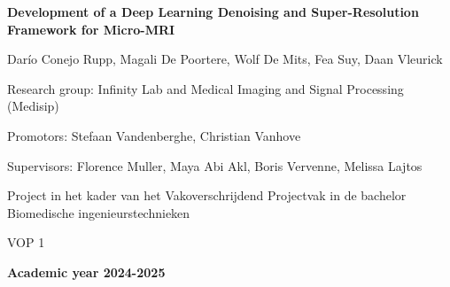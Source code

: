 \documentclass[twocolumn]{article}
\begin{document}
\begin{titlepage}
    \centering
    \vspace*{\fill}
    
    {\LARGE \textbf{Development of a Deep Learning Denoising and Super-Resolution Framework for Micro-MRI} \par}
    \vspace{0.5cm}

    {\Large Darío Conejo Rupp, Magali De Poortere, Wolf De Mits, Fea Suy, Daan Vleurick \par}
    \vspace{2cm}

    {\large Research group: Infinity Lab and Medical Imaging and Signal Processing (Medisip) \par}
    \vspace{0.2cm}

    {\large Promotors: Stefaan Vandenberghe, Christian Vanhove \par}
    \vspace{0.2cm}

    {\large Supervisors: Florence Muller, Maya Abi Akl, Boris Vervenne, Melissa Lajtos \par}

    \vspace{2cm}

    {\large {Project in het kader van het Vakoverschrijdend Projectvak in de bachelor Biomedische ingenieurstechnieken} \par}
    {\large {VOP 1} \par}
    {\large \textbf{Academic year 2024-2025} \par}

    \vspace*{\fill}
\end{titlepage}

\newpage
\onecolumn
\begin{abstract}
Magnetic resonance imaging (MRI) is a non‐invasive imaging technique that uses magnetic fields and radiofrequency pulses to generate detailed anatomical images. Micro-MRI, a preclinical imaging modality, offers excellent soft tissue contrast for anatomical visualization in rodent models. However, achieving an optimal balance between spatial resolution, acquisition time, and signal to noise ratio (SNR) remains challenging. In this study a deep learning denoising and super-resolution framework for micro-MRI to reduce scan time while enhancing spatial resolution is developed. A total of 24 mice were scanned using a $7$T Bruker Pharmascan micro-MRI scanner. For each T2-weighted image, 2 scans were acquired: a 1-minute low-resolution scan and a 12-minute high-resolution scan. Following data acquisition, a U-Net architecture was optimized by exploring different hyperparameters. In addition, a second model was designed and trained. 
\end{abstract}\hspace{15pt}
\newpage
\end{document}
